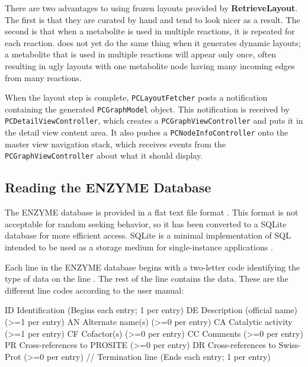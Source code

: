 There are two advantages to using frozen layouts provided by
\textbf{RetrieveLayout}. The first is that they are curated by hand and tend to
look nicer as a result. The second is that when a metabolite is used in multiple
reactions, it is repeated for each reaction. \keggapp does not yet do the same
thing when it generates dynamic layouts; a metabolite that is used in multiple
reactions will appear only once, often resulting in ugly layouts with one
metabolite node having many incoming edges from many reactions.

When the layout step is complete, \texttt{PCLayoutFetcher} posts a notification
containing the generated \texttt{PCGraphModel} object. This notification is
received by \texttt{PCDetailViewController}, which creates a
\texttt{PCGraphViewController} and puts it in the detail view content area. It
also pushes a \texttt{PCNodeInfoController} onto the master view navigation
stack, which receives events from the \texttt{PCGraphViewController} about what
it should display.

\subsection{Reading the ENZYME Database}
\label{sect:kegg_impl_enzyme}

The ENZYME database is provided in a flat text file format
\cite{enzyme:enzuser}. This format is not acceptable for random seeking
behavior, so it has been converted to a SQLite database \cite{sqlite:main} for
more efficient access. SQLite is a minimal implementation of SQL intended to be
used as a storage medium for single-instance applications \cite{sqlite:main}.

Each line in the ENZYME database begins with a two-letter code identifying the
type of data on the line \cite{enzyme:enzuser}. The rest of the line contains
the data. These are the different line codes according to the user manual:

\begin{objc}
ID  Identification                         (Begins each entry;
                                            1 per entry)
DE  Description (official name)            (>=1 per entry)
AN  Alternate name(s)                      (>=0 per entry)
CA  Catalytic activity                     (>=1 per entry)
CF  Cofactor(s)                            (>=0 per entry)
CC  Comments                               (>=0 per entry)
PR  Cross-references to PROSITE            (>=0 per entry)
DR  Cross-references to Swiss-Prot         (>=0 per entry)
//  Termination line                       (Ends each entry;
                                            1 per entry)
\end{objc}

